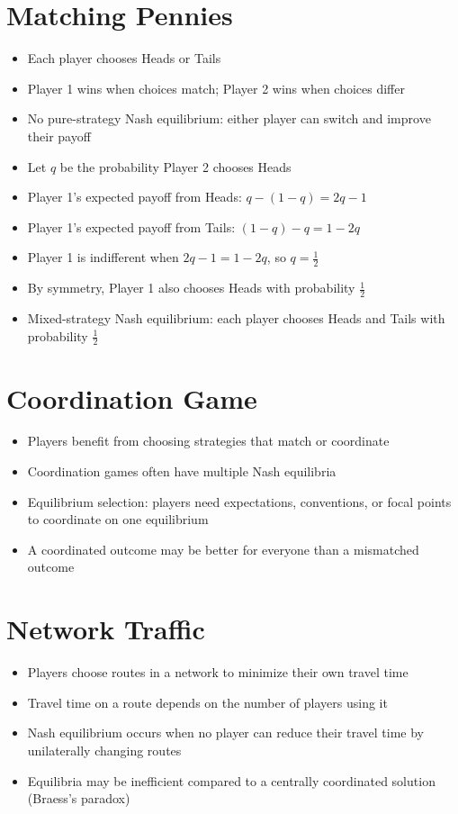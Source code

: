 \section{Matching Pennies}
\begin{itemize}
    \item Each player chooses Heads or Tails
    \item Player 1 wins when choices match; Player 2 wins when choices differ
    \item No pure-strategy Nash equilibrium: either player can switch and improve their payoff
    \item Let $q$ be the probability Player 2 chooses Heads
    \item Player 1's expected payoff from Heads: $q - (1-q) = 2q-1$
    \item Player 1's expected payoff from Tails: $(1-q)-q = 1-2q$
    \item Player 1 is indifferent when $2q-1=1-2q$, so $q=\frac{1}{2}$
    \item By symmetry, Player 1 also chooses Heads with probability $\frac{1}{2}$
    \item Mixed-strategy Nash equilibrium: each player chooses Heads and Tails with probability $\frac{1}{2}$
\end{itemize}

\section{Coordination Game}
\begin{itemize}
    \item Players benefit from choosing strategies that match or coordinate
    \item Coordination games often have multiple Nash equilibria
    \item Equilibrium selection: players need expectations, conventions, or focal points to coordinate on one equilibrium
    \item A coordinated outcome may be better for everyone than a mismatched outcome
\end{itemize}

\section{Network Traffic}

\begin{itemize}
    \item Players choose routes in a network to minimize their own travel time
    \item Travel time on a route depends on the number of players using it
    \item Nash equilibrium occurs when no player can reduce their travel time by unilaterally changing routes
    \item Equilibria may be inefficient compared to a centrally coordinated solution (Braess's paradox)
\end{itemize}